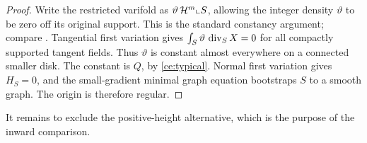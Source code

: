 \begin{proof}
Write the restricted varifold as $\vartheta\,\mathcal H^m\llcorner S$,
allowing the integer density $\vartheta$ to be zero off its original
support. This is the standard constancy argument; compare
\cite[Chapter~8, Theorem~4.1]{Simon2018}. Tangential first variation gives
$\int_S\vartheta\,\operatorname{div}_S X=0$ for all compactly supported tangent
fields.  Thus $\vartheta$ is constant almost everywhere on a connected
smaller disk.  The constant is $Q$, by \eqref{ce:typical}.  Normal
first variation gives $H_S=0$, and the small-gradient minimal graph
equation bootstraps $S$ to a smooth graph.  The origin is therefore
regular.
\end{proof}

It remains to exclude the positive-height alternative, which is the
purpose of the inward comparison.
